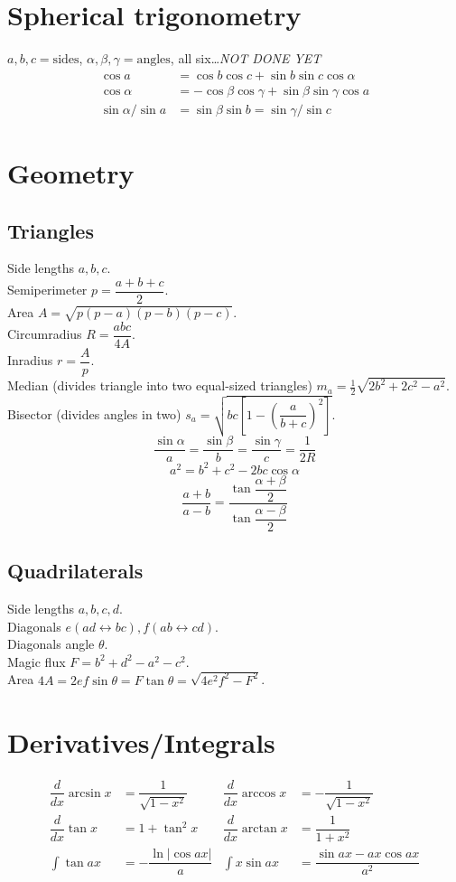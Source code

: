 \section{Spherical trigonometry}
$a,b,c=\text{sides}$, $\alpha,\beta,\gamma=\text{angles}$, all
six\ldots \emph{NOT DONE YET}
\begin{align*}
\cos a&{}=\cos b \cos c + \sin b \sin c \cos \alpha\\
\cos \alpha&{}=-\cos\beta \cos\gamma + \sin\beta\sin\gamma\cos a\\
\sin \alpha/\sin a&{}=\sin\beta\sin b=\sin\gamma/\sin c
\end{align*}
\section{Geometry}
\subsection{Triangles}
Side lengths $a,b,c$.\\
Semiperimeter $p=\dfrac{a+b+c}{2}$.\\
Area $A=\sqrt{p(p-a)(p-b)(p-c)}$.\\
Circumradius $R=\dfrac{abc}{4A}$.\\
Inradius $r=\dfrac{A}{p}$.\\
Median (divides triangle into two equal-sized triangles)
$m_a=\tfrac{1}{2}\sqrt{2b^2+2c^2-a^2}$.\\
Bisector (divides angles in two)
$s_a=\sqrt{bc\left[1-\left(\dfrac{a}{b+c}\right)^2\right]}$.
$$\frac{\sin\alpha}{a}=\frac{\sin\beta}{b}=\frac{\sin\gamma}{c}=\frac{1}{2R}$$
$$a^2=b^2+c^2-2bc\cos\alpha$$
$$\frac{a+b}{a-b}=\frac{\tan\dfrac{\alpha+\beta}{2}}{\tan\dfrac{\alpha-\beta}{2}}$$
\subsection{Quadrilaterals}
Side lengths $a,b,c,d$.\\
Diagonals $e(ad\leftrightarrow bc), f(ab\leftrightarrow cd)$.\\
Diagonals angle $\theta$.\\
Magic flux $F=b^2+d^2-a^2-c^2$.\\
Area $4A=2ef\sin\theta=F\tan\theta=\sqrt{4e^2f^2-F^2}$.
\section{Derivatives/Integrals}
\begin{align*}
\dfrac{d}{dx}\arcsin x&{}=\dfrac{1}{\sqrt{1-x^2}} &
\dfrac{d}{dx}\arccos x&{}=-\dfrac{1}{\sqrt{1-x^2}}\\
\dfrac{d}{dx}\tan x&{}=1+\tan^2 x &
\dfrac{d}{dx}\arctan x&{}=\dfrac{1}{1+x^2}\\
\int\tan ax&{}=-\dfrac{\ln|\cos ax|}{a} &
\int x\sin ax&{}=\dfrac{\sin ax-ax \cos ax}{a^2}
\end{align*}
